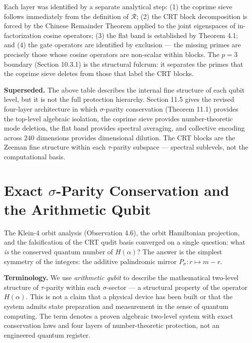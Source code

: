 \documentclass[11pt,letterpaper]{article}
\theoremstyle{definition}
\theoremstyle{remark}
\begin{document}
Each layer was identified by a separate analytical step: (1) the coprime sieve follows immediately from the definition of $\mathcal{R}$; (2) the CRT block decomposition is forced by the Chinese Remainder Theorem applied to the joint eigenspaces of in-factorization cosine operators; (3) the flat band is established by Theorem 4.1; and (4) the gate operators are identified by exclusion --- the missing primes are precisely those whose cosine operators are non-scalar within blocks. The $p = 3$ boundary (Section 10.3.1) is the structural fulcrum: it separates the primes that the coprime sieve deletes from those that label the CRT blocks.

\textbf{Superseded.} The above table describes the internal fine structure of each qubit level, but it is not the full protection hierarchy. Section 11.5 gives the revised four-layer architecture in which $\sigma$-parity conservation (Theorem 11.1) provides the top-level algebraic isolation, the coprime sieve provides number-theoretic mode deletion, the flat band provides spectral averaging, and collective encoding across 240 dimensions provides dimensional dilution. The CRT blocks are the Zeeman fine structure within each $\tau$-parity subspace --- spectral sublevels, not the computational basis.

\section{Exact $\sigma$-Parity Conservation and the Arithmetic Qubit}\label{exact-sigma-parity-conservation-and-the-arithmetic-qubit}

The Klein-4 orbit analysis (Observation 4.6), the orbit Hamiltonian projection, and the falsification of the CRT qudit basis converged on a single question: what \emph{is} the conserved quantum number of $H(\alpha)$? The answer is the simplest symmetry of the integers: the additive palindromic mirror $P_\sigma: r \mapsto m - r$.

\textbf{Terminology.} We use \emph{arithmetic qubit} to describe the mathematical two-level structure of $\tau$-parity within each $\sigma$-sector --- a structural property of the operator $H(\alpha)$. This is not a claim that a physical device has been built or that the system admits state preparation and measurement in the sense of quantum computing. The term denotes a proven algebraic two-level system with exact conservation laws and four layers of number-theoretic protection, not an engineered quantum register.
\end{document}

